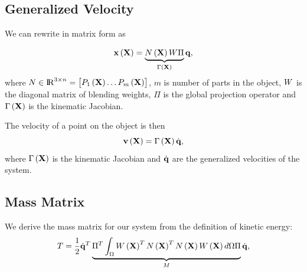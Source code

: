 \subsection{Generalized Velocity}

We can rewrite  in matrix form as 

\begin{equation}
    \mathbf{x}\left(\mathbf{X}\right) = \underbrace{N\left(\mathbf{X}\right)W\Pi}_{\Gamma\left(\mathbf{X}\right)}\mathbf{q},
\end{equation} where $N\in{\rm I\!R}^{3\times n} = \begin{bmatrix}P_1\left(\mathbf{X}\right) \dots P_m\left(\mathbf{X}\right)\end{bmatrix}$, $m$ is number of 
parts in the object, $W$ is the diagonal matrix of blending weights, $\Pi$ is the global projection operator and $\Gamma\left(\mathbf{X}\right)$ is the kinematic Jacobian.

The velocity of a point on the object is then  
\begin{equation}
        \mathbf{v}\left(\mathbf{X}\right) = \Gamma\left(\mathbf{X}\right)\dot{\mathbf{q}},
    \end{equation} where $\Gamma\left(\mathbf{X}\right)$ is the kinematic Jacobian and $\dot{\mathbf{q}}$ are the generalized velocities of the system.

\subsection{Mass Matrix}
\label{ssec:mass_matrix}

We derive the mass matrix for our system from the definition of kinetic energy:
\begin{equation}
    T = \frac{1}{2}\dot{\mathbf{q}}^T\underbrace{\Pi^T\int_{\Omega}W\left(\mathbf{X}\right)^TN\left(\mathbf{X}\right)^TN\left(\mathbf{X}\right)W\left(\mathbf{X}\right)d\Omega\Pi}_{M}\dot{\mathbf{q}},
\end{equation}


